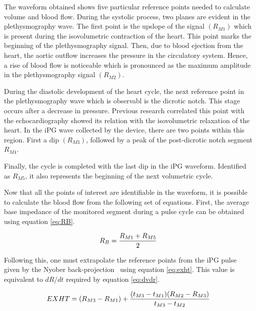 The waveform obtained shows five particular reference points needed to calculate volume and blood flow. During the systolic process, two planes are evident in the plethysmography wave. The first point is the upslope of the signal $(R_{M1})$ which is present during the isovolumetric contraction of the heart.  This point marks the beginning of the plethysmography signal. Then, due to blood ejection from the heart, the aortic outflow increases the pressure in the circulatory system. Hence, a rise of blood flow is noticeable which is pronounced as the maximum amplitude in the plethysmography signal $(R_{M2})$. 

During the diastolic development of the heart cycle, the next reference point in the plethysmography wave which is observabl is the dicrotic notch. This stage occurs after a decrease in pressure. Previous research correlated this point with the echocardiography showed its relation with the isovolumetric relaxation of the heart. In the iPG wave collected by the device, there are two points within this region. First a dip $(R_{M3})$, followed by a peak of the post-dicrotic notch segment $R_{M4}$. 


Finally, the cycle is completed with the last dip in the iPG waveform. Identified as $R_{M5}$, it also represents the beginning of the next volumetric cycle. 

Now that all the points of interest are identifiable in the waveform, it is possible to calculate the blood flow from the following set of equations. First, the average base impedance of the monitored segment during a pulse cycle can be obtained using equation \ref{eq:RB}.

\begin{align}
	\label{eq:RB}
	R_B = \frac{R_{M1}+R_{M5}}{2} \tagaddtext{[\si{\Omega}]}
\end{align}

Following this, one must extrapolate the reference points from the iPG pulse given by the Nyober back-projection~\cite{montgomery2011segmental} using equation \ref{eq:exht}. This value is equivalent to $dR/dt$ required  by equation \ref{eq:dvdr}.

\begin{align}
	\label{eq:exht}
	EXHT = (R_{M3}-R_{M1}) + \frac{(t_{M3}-t_{M1})(R_{M2}-R_{M3})}{t_{M3}-t_{M2}} \tagaddtext{[\si{\Omega}]}
\end{align}

